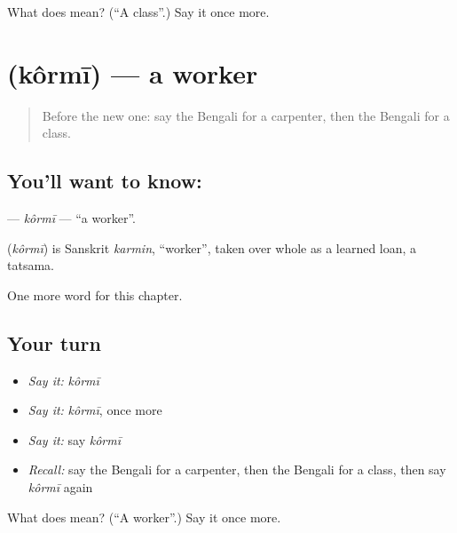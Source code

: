 \begin{tcolorbox}[breakable,colback=teal!4,colframe=teal!35!black,title={Before you move on}]
What does  mean? (\textquotedblleft{}A class\textquotedblright{}.) Say it once more.
\end{tcolorbox}
\section[\texorpdfstring{\bn{কর্মী} (kôrmī)}{কর্মী (kôrmī)}]{ (kôrmī) — a worker}

\label{lesson:BN-C236-kormi}



\begin{quote}
Before the new one: say the Bengali for a carpenter, then the Bengali for a class.
\end{quote}

\subsection*{You'll want to know: }
\textbf{} — \emph{kôrmī} — \textquotedblleft{}a worker\textquotedblright{}.

\begin{cousinweb}
\textbf{} (\emph{kôrmī}) is Sanskrit \emph{karmin}, \textquotedblleft{}worker\textquotedblright{}, taken over whole as a learned loan, a tatsama.
\end{cousinweb}

\begin{grammarlens}[title={What you've built}]
One more word for this chapter.
\end{grammarlens}

\subsection*{Your turn}
\begin{itemize}
\raggedright
  \item \emph{Say it:} \emph{kôrmī}
  \item \emph{Say it:} \emph{kôrmī}, once more
  \item \emph{Say it:} say \emph{kôrmī}
  \item \emph{Recall:} say the Bengali for a carpenter, then the Bengali for a class, then say \emph{kôrmī} again
\end{itemize}

\begin{tcolorbox}[breakable,colback=teal!4,colframe=teal!35!black,title={Before you move on}]
What does  mean? (\textquotedblleft{}A worker\textquotedblright{}.) Say it once more.
\end{tcolorbox}
